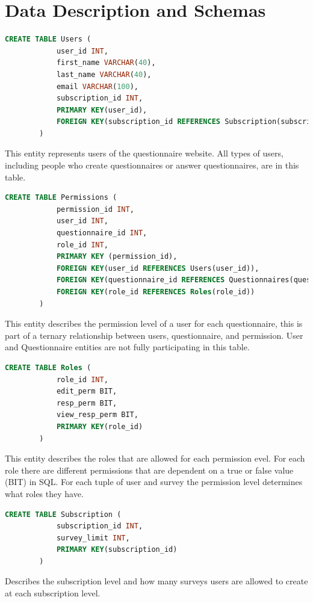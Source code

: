 \documentclass[12pt, oneside, a4paper]{article}
\begin{document}
    \newpage
    \section{Data Description and Schemas}
    \begin{lstlisting}[language=SQL, columns=flexible]
        CREATE TABLE Users (
            user_id INT,
            first_name VARCHAR(40),
            last_name VARCHAR(40),
            email VARCHAR(100),
            subscription_id INT, 
            PRIMARY KEY(user_id),
            FOREIGN KEY(subscription_id REFERENCES Subscription(subscription_id))
        ) 
    \end{lstlisting}
    This entity represents users of the questionnaire website.
    All types of users, including people who create questionnaires
    or answer questionnaires, are in this table.
    \\

    \begin{lstlisting}[language=SQL, columns=flexible]
        CREATE TABLE Permissions (
            permission_id INT,
            user_id INT,
            questionnaire_id INT,
            role_id INT,
            PRIMARY KEY (permission_id),
            FOREIGN KEY(user_id REFERENCES Users(user_id)),
            FOREIGN KEY(questionnaire_id REFERENCES Questionnaires(questionnaire_id)),
            FOREIGN KEY(role_id REFERENCES Roles(role_id))
        ) 
    \end{lstlisting}
    This entity describes the permission level of a user for each 
    questionnaire, this is part of a ternary relationship between users, questionnaire, and permission. User and Questionnaire entities are not fully participating in this table. 
    \\
    
    \begin{lstlisting}[language=SQL, columns=flexible]
        CREATE TABLE Roles (
            role_id INT,
            edit_perm BIT, 
            resp_perm BIT,
            view_resp_perm BIT,
            PRIMARY KEY(role_id)
        ) 
    \end{lstlisting}
    This entity describes the roles that are allowed for each permission evel. For each role there are different permissions that are dependent on a true or false value (BIT) in SQL. For each tuple of user and survey the permission level determines what roles they have.
    \\

    \begin{lstlisting}[language=SQL, columns=flexible]
        CREATE TABLE Subscription (
            subscription_id INT,
            survey_limit INT, 
            PRIMARY KEY(subscription_id)
        ) 
    \end{lstlisting}
    Describes the subscription level and how many surveys users are allowed to create at each subscription level. 
    \\
\end{document}
